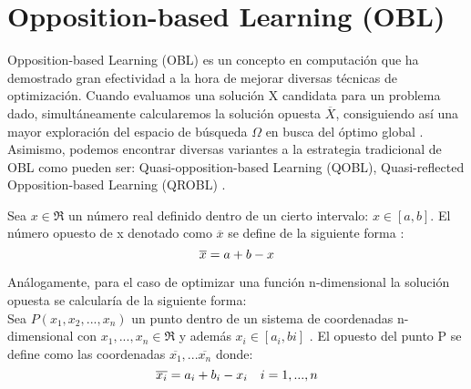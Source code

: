 

\section{Opposition-based Learning (OBL)}
\label{sec:OBL}

Opposition-based Learning (OBL) \cite{obl, obl2, OPSO, OPSO2, OPSO3} es un concepto en computación que ha demostrado gran efectividad a la hora de mejorar diversas técnicas de optimización. Cuando evaluamos una solución X candidata para un problema dado, simultáneamente  
 calcularemos la solución opuesta $\overline{X}$, consiguiendo así una mayor exploración del espacio de búsqueda $\Omega$ en busca del óptimo global \cite{obl}. Asimismo, podemos encontrar diversas variantes a la estrategia tradicional de OBL como pueden ser: Quasi-opposition-based Learning (QOBL), Quasi-reflected Opposition-based Learning (QROBL) \cite{Segredo2017_2}.

Sea $x \in \Re $  un número real definido dentro de un cierto intervalo: $x \in [a,b]$. El número opuesto de x denotado como $\overline{x}$ se define de la siguiente forma \cite{obl}: \\
 \begin{equation}
     \overline{x} = a + b - x  \\
 \end{equation}

Análogamente, para el caso de optimizar una función n-dimensional la solución opuesta se calcularía de la siguiente forma: \\

 Sea $ P(x_{1}, x_{2},...,x_{n}) $ un punto dentro de un sistema de coordenadas n-dimensional con $ x_{1},...,x_{n} \in \Re$ y además $ x_{i} \in [a_{i}, b{i}]$ \cite{obl}. El opuesto del punto P se define como las coordenadas $\overline{x_{1}},...\overline{x_{n}}$ donde:\\
\begin{equation}
    \overline{x_{i}} = a_{i} + b_{i} - x_{i} \quad i = 1,...,n \\
\end{equation}

